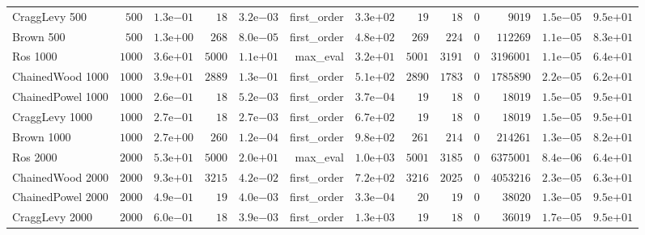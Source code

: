 \begin{longtable}[c]{lrrrrrrrrrrrr}
CraggLevy 500 & \(  500\) & \( 1.3\)e\(-01\) & \(   18\) & \( 3.2\)e\(-03\) & first\_order & \( 3.3\)e\(+02\) & \(   19\) & \(   18\) & \(    0\) & \( 9019\) & \( 1.5\)e\(-05\) & \( 9.5\)e\(+01\) \\
Brown 500 & \(  500\) & \( 1.3\)e\(+00\) & \(  268\) & \( 8.0\)e\(-05\) & first\_order & \( 4.8\)e\(+02\) & \(  269\) & \(  224\) & \(    0\) & \(112269\) & \( 1.1\)e\(-05\) & \( 8.3\)e\(+01\) \\
Ros 1000 & \( 1000\) & \( 3.6\)e\(+01\) & \( 5000\) & \( 1.1\)e\(+01\) & max\_eval & \( 3.2\)e\(+01\) & \( 5001\) & \( 3191\) & \(    0\) & \(3196001\) & \( 1.1\)e\(-05\) & \( 6.4\)e\(+01\) \\
ChainedWood 1000 & \( 1000\) & \( 3.9\)e\(+01\) & \( 2889\) & \( 1.3\)e\(-01\) & first\_order & \( 5.1\)e\(+02\) & \( 2890\) & \( 1783\) & \(    0\) & \(1785890\) & \( 2.2\)e\(-05\) & \( 6.2\)e\(+01\) \\
ChainedPowel 1000 & \( 1000\) & \( 2.6\)e\(-01\) & \(   18\) & \( 5.2\)e\(-03\) & first\_order & \( 3.7\)e\(-04\) & \(   19\) & \(   18\) & \(    0\) & \(18019\) & \( 1.5\)e\(-05\) & \( 9.5\)e\(+01\) \\
CraggLevy 1000 & \( 1000\) & \( 2.7\)e\(-01\) & \(   18\) & \( 2.7\)e\(-03\) & first\_order & \( 6.7\)e\(+02\) & \(   19\) & \(   18\) & \(    0\) & \(18019\) & \( 1.5\)e\(-05\) & \( 9.5\)e\(+01\) \\
Brown 1000 & \( 1000\) & \( 2.7\)e\(+00\) & \(  260\) & \( 1.2\)e\(-04\) & first\_order & \( 9.8\)e\(+02\) & \(  261\) & \(  214\) & \(    0\) & \(214261\) & \( 1.3\)e\(-05\) & \( 8.2\)e\(+01\) \\
Ros 2000 & \( 2000\) & \( 5.3\)e\(+01\) & \( 5000\) & \( 2.0\)e\(+01\) & max\_eval & \( 1.0\)e\(+03\) & \( 5001\) & \( 3185\) & \(    0\) & \(6375001\) & \( 8.4\)e\(-06\) & \( 6.4\)e\(+01\) \\
ChainedWood 2000 & \( 2000\) & \( 9.3\)e\(+01\) & \( 3215\) & \( 4.2\)e\(-02\) & first\_order & \( 7.2\)e\(+02\) & \( 3216\) & \( 2025\) & \(    0\) & \(4053216\) & \( 2.3\)e\(-05\) & \( 6.3\)e\(+01\) \\
ChainedPowel 2000 & \( 2000\) & \( 4.9\)e\(-01\) & \(   19\) & \( 4.0\)e\(-03\) & first\_order & \( 3.3\)e\(-04\) & \(   20\) & \(   19\) & \(    0\) & \(38020\) & \( 1.3\)e\(-05\) & \( 9.5\)e\(+01\) \\
CraggLevy 2000 & \( 2000\) & \( 6.0\)e\(-01\) & \(   18\) & \( 3.9\)e\(-03\) & first\_order & \( 1.3\)e\(+03\) & \(   19\) & \(   18\) & \(    0\) & \(36019\) & \( 1.7\)e\(-05\) & \( 9.5\)e\(+01\) \\

\end{longtable}
